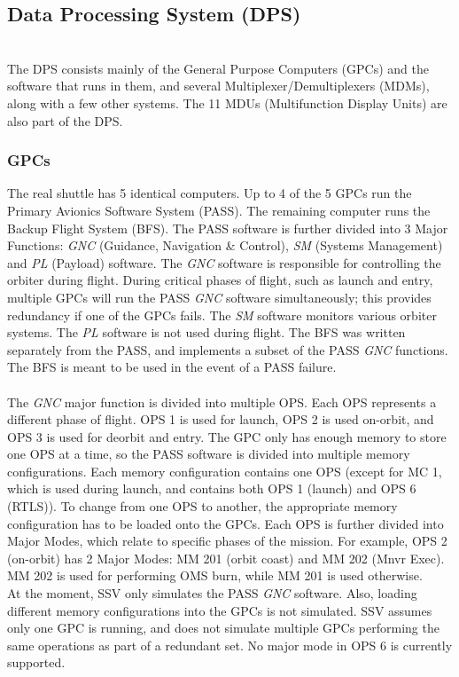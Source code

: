 \documentclass[Space_Shuttle_Vessel_Manual.tex]{subfiles}
\begin{document}
\subsection{Data Processing System (DPS)}
\begin{multicols*}{2}
\renewcommand{\cfttoctitlefont}{\bf}
\localtableofcontents
\noindent
\\
The DPS consists mainly of the General Purpose Computers (GPCs) and the software that runs in them, and several Multiplexer/Demultiplexers (MDMs), along with a few other systems. The 11 MDUs (Multifunction Display Units) are also part of the DPS.
\subsubsection{GPCs}
The real shuttle has 5 identical computers. Up to 4 of the 5 GPCs run the Primary Avionics Software System (PASS). The remaining computer runs the Backup Flight System (BFS). The PASS software is further divided into 3 Major Functions: \textit{GNC} (Guidance, Navigation \& Control), \textit{SM} (Systems Management) and \textit{PL} (Payload) software. The \textit{GNC} software is responsible for controlling the orbiter during flight. During critical phases of flight, such as launch and entry, multiple GPCs will run the PASS \textit{GNC} software simultaneously; this provides redundancy if one of the GPCs fails. The \textit{SM} software monitors various orbiter systems. The \textit{PL} software is not used during flight. The BFS was written separately from the PASS, and implements a subset of the PASS \textit{GNC} functions. The BFS is meant to be used in the event of a PASS failure.\\
\\
The \textit{GNC} major function is divided into multiple OPS. Each OPS represents a different phase of flight. OPS 1 is used for launch, OPS 2 is used on-orbit, and OPS 3 is used for deorbit and entry. The GPC only has enough memory to store one OPS at a time, so the PASS software is divided into multiple memory configurations. Each memory configuration contains one OPS (except for MC 1, which is used during launch, and contains both OPS 1 (launch) and OPS 6 (RTLS)). To change from one OPS to another, the appropriate memory configuration has to be loaded onto the GPCs.
Each OPS is further divided into Major Modes, which relate to specific phases of the mission. For example, OPS 2 (on-orbit) has 2 Major Modes: MM 201 (orbit coast) and MM 202 (Mnvr Exec). MM 202 is used for performing OMS burn, while MM 201 is used otherwise.
\\
At the moment, SSV only simulates the PASS \textit{GNC} software. Also, loading different memory configurations into the GPCs is not simulated. SSV assumes only one GPC is running, and does not simulate multiple GPCs performing the same operations as part of a redundant set. No major mode in OPS 6 is currently supported.


\end{multicols*}
\end{document}
